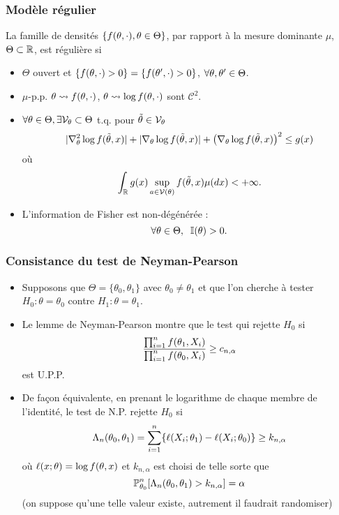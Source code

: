 \begin{frame}
\frametitle{Modèle régulier}
\begin{df} La famille de densités $\{f(\theta,\cdot),\theta \in \Theta\}$,  par rapport à la mesure dominante $\mu$, $\Theta \subset \operatorname{{\mathbb R}}$, est \alert{régulière} si
\begin{itemize}
\item $\Theta$ ouvert et $\{f(\theta, \cdot)>0\}=\{f(\theta', \cdot)>0\}$, $\forall \theta, \theta' \in \Theta$.
\item $\mu$-p.p. $\theta \leadsto f(\theta,\cdot)$, $\theta \leadsto \log f(\theta,\cdot)$ sont ${\mathcal C}^2$.
 \item $\forall \theta \in \Theta, \exists {\mathcal V}_\theta \subset \Theta$ t.q. pour $\tilde{\theta} \in {\mathcal V}_\theta$
$$|\nabla_\theta^{2}\log f(\tilde{\theta},x)|+|\nabla_\theta \log f(\tilde{\theta},x)|+\big(\nabla_\theta\log f(\tilde{\theta},x)\big)^2\leq g(x)$$
où
$$\int_{\mathbb{R}}g(x)\sup_{a \in {\mathcal V}(\theta)}f(\tilde{\theta},x)\mu(dx)<+\infty.$$
\item L'information de Fisher est non-dégénérée :
$$\forall \theta \in \Theta,\;\;\mathbb{I}(\theta) >0.$$
\end{itemize}
\end{df}
\end{frame}

\begin{frame}
\frametitle{Consistance du test de Neyman-Pearson}
\begin{itemize}
\item Supposons que $\Theta= \{\theta_0,\theta_1\}$ avec $\theta_0 \ne \theta_1$ et que l'on cherche à tester $H_0: \theta = \theta_0$ contre $H_1: \theta= \theta_1$.
\item Le lemme de Neyman-Pearson montre que le test qui rejette $H_0$ si
\[
\frac{\prod_{i=1}^n f(\theta_1,X_i)}{\prod_{i=1}^{n} f(\theta_0,X_i)} \geq c_{n,\alpha}
\]
est U.P.P.
\item De façon équivalente, en prenant le logarithme de chaque membre de l'identité, le test de N.P. rejette $H_0$ si
\[
\Lambda_n(\theta_0,\theta_1) = \sum_{i=1}^n \{ \ell(X_i; \theta_1) - \ell(X_i; \theta_0) \} \geq k_{n,\alpha}
\]
où $\ell(x;\theta)= \log f(\theta,x)$ et $k_{n,\alpha}$ est choisi de telle sorte que
\[
\operatorname{{\mathbb P}}_{\theta_0}^n [ \Lambda_n(\theta_0,\theta_1)  > k_{n,\alpha}] = \alpha
\]
(on suppose qu'une telle valeur existe, autrement il faudrait randomiser)
\end{itemize}
\end{frame}

